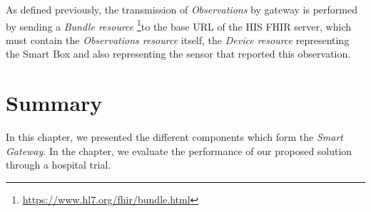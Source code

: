 As defined previously, the transmission of \textit{Observations} by gateway is performed by sending a \textit{Bundle resource} \footnote{\url{https://www.hl7.org/fhir/bundle.html}}to the base URL of the HIS FHIR server, which must contain the \textit{Observations resource} itself, the \textit{Device resource} representing the Smart Box and also representing the sensor that reported this observation.

\section{Summary}

In this chapter, we presented the different components which form the \textit{Smart Gateway}. In the chapter, we evaluate the performance of our proposed solution through a hospital trial.